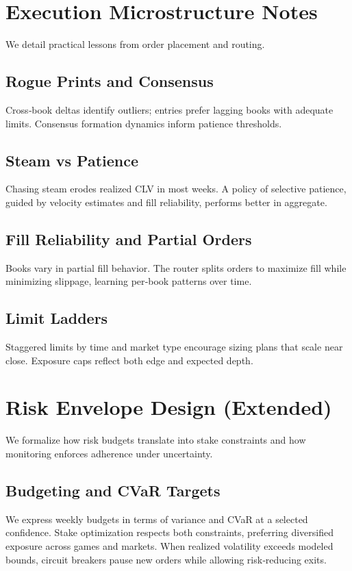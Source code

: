 \documentclass[12pt]{report}  %
\numberwithin{equation}{section}
\theoremstyle{plain}
\theoremstyle{definition}
\theoremstyle{remark}
\begin{document}
\chapter{Execution Microstructure Notes}
We detail practical lessons from order placement and routing.

\section{Rogue Prints and Consensus}
Cross‑book deltas identify outliers; entries prefer lagging books with adequate limits. Consensus formation dynamics inform patience thresholds.

\section{Steam vs Patience}
Chasing steam erodes realized CLV in most weeks. A policy of selective patience, guided by velocity estimates and fill reliability, performs better in aggregate.

\section{Fill Reliability and Partial Orders}
Books vary in partial fill behavior. The router splits orders to maximize fill while minimizing slippage, learning per‑book patterns over time.

\section{Limit Ladders}
Staggered limits by time and market type encourage sizing plans that scale near close. Exposure caps reflect both edge and expected depth.

\chapter{Risk Envelope Design (Extended)}
We formalize how risk budgets translate into stake constraints and how monitoring enforces adherence under uncertainty.

\section{Budgeting and CVaR Targets}
We express weekly budgets in terms of variance and CVaR at a selected confidence. Stake optimization respects both constraints, preferring diversified exposure across games and markets. When realized volatility exceeds modeled bounds, circuit breakers pause new orders while allowing risk‑reducing exits.
\end{document}
